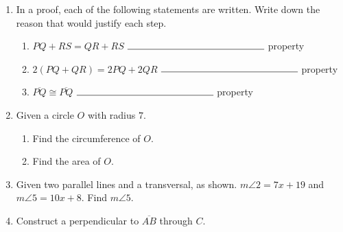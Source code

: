 \documentclass[12pt, oneside]{article}
\begin{document}
\begin{enumerate}
  \item In a proof, each of the following statements are written. Write down the reason that would justify each step. \bigskip
    \begin{enumerate}
      \item $PQ+RS= QR+RS$  \hspace{1.7cm} $\rule{5cm}{0.15mm}$ property  \bigskip
      \item $2(PQ + QR)=2PQ+2QR$  \hspace{0.6cm} $\rule{5cm}{0.15mm}$ property \bigskip
      \item $\overline{PQ} \cong \overline{PQ}$ \hspace{4cm} $\rule{5cm}{0.15mm}$ property
    \end{enumerate}

  \item Given a circle $O$ with radius $7$.
  \begin{enumerate}
    \item Find the circumference of $O$. \vspace{2cm}
    \item Find the area of $O$.
  \end{enumerate}

\newpage
\item Given two parallel lines and a transversal, as shown. $m\angle 2=7x+19$ and $m\angle 5=10x+8$. Find $m\angle 5$.
  \begin{center}
  \end{center}


  \item Construct a perpendicular to $\overline{AB}$ through $C$.\\
    \vspace{3cm}
    \begin{center}
    \end{center}
    \vspace{4cm}


\end{enumerate}
\end{document}
